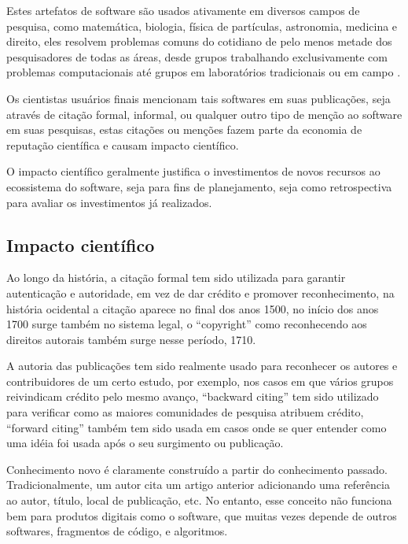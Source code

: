 
Estes artefatos de software são usados ativamente em diversos campos de pesquisa, como
matemática, biologia, física de partículas, astronomia, medicina e direito,
eles resolvem problemas comuns do cotidiano de pelo menos metade dos
pesquisadores de todas as áreas, desde grupos trabalhando exclusivamente com
problemas computacionais até grupos em laboratórios tradicionais ou em campo
\cite{wilson2014best}.

Os cientistas usuários finais mencionam tais softwares em suas publicações,
seja através de citação formal, informal, ou qualquer outro tipo de menção ao
software em suas pesquisas, estas citações ou menções fazem parte da economia
de reputação científica e causam impacto científico.

O impacto científico geralmente justifica o investimentos de novos recursos ao
ecossistema do software, seja para fins de planejamento, seja como
retrospectiva para avaliar os investimentos já realizados.

\subsection{Impacto científico}


Ao longo da história, a citação formal tem sido utilizada para garantir
autenticação e autoridade, em vez de dar crédito e promover reconhecimento, na
história ocidental a citação aparece no final dos anos 1500, no início dos anos
1700 surge também no sistema legal, o ``copyright'' como reconhecendo aos
direitos autorais também surge nesse período, 1710.

A autoria das publicações tem sido realmente usado para reconhecer os autores e
contribuidores de um certo estudo, por exemplo, nos casos em que vários grupos
reivindicam crédito pelo mesmo avanço, ``backward citing'' tem sido utilizado
para verificar como as maiores comunidades de pesquisa atribuem crédito,
``forward citing'' também tem sido usada em casos onde se quer entender como
uma idéia foi usada após o seu surgimento ou publicação.

Conhecimento novo é claramente construído a partir do conhecimento passado.
Tradicionalmente, um autor cita um artigo anterior adicionando uma referência
ao autor, título, local de publicação, etc. No entanto, esse conceito não
funciona bem para produtos digitais como o software, que muitas vezes depende
de outros softwares, fragmentos de código, e algoritmos.

